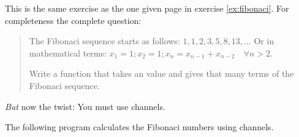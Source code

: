 \begin{Exercise}[title={Fibonaci II},difficulty=7]
\label{ex:fibonaci II}
\Question\label{ex:fibonaci II q1}
This is the same exercise as the one given page \pageref{ex:fibonaci} 
in exercise \ref{ex:fibonaci}. For completeness the complete question:

\begin{quote}
The Fibonaci sequence starts as follows: $1, 1, 2, 3, 5, 8, 13, \ldots$
Or in mathematical terms: $ x_1 = 1; x_2 = 1; x_n = x_{n-1} +
x_{n-2}\quad\forall n > 2 $.

Write a function that takes an  value and gives 
that many terms of the Fibonaci sequence.
\end{quote}

\begin{lbar}
\emph{But} now the twist: You must use channels.
\end{lbar}


\end{Exercise}

\begin{Answer}
\Question
The following program calculates the Fibonaci numbers using channels.

\end{Answer}


